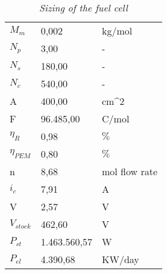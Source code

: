 \begin{table}[ht]
\centering
\begin{tabular}{|lll|}
\hline
\rowcolor{bluepoli!40}\multicolumn{3}{|c|}{\textbf{Fuel cell sizing}}                                  \\ \hline
\multicolumn{1}{|l|}{$M_m$}        & \multicolumn{1}{l|}{0,002}        & kg/mol                \\ \hline
\multicolumn{1}{|l|}{$N_p$}        & \multicolumn{1}{l|}{3,00}         & -                     \\ \hline
\multicolumn{1}{|l|}{$N_s$}        & \multicolumn{1}{l|}{180,00}       & -                     \\ \hline
\multicolumn{1}{|l|}{$N_c$}        & \multicolumn{1}{l|}{540,00}       & -                     \\ \hline
\multicolumn{1}{|l|}{A}            & \multicolumn{1}{l|}{400,00}       & cm\textasciicircum{}2 \\ \hline
\multicolumn{1}{|l|}{F}            & \multicolumn{1}{l|}{96.485,00}    & C/mol                 \\ \hline
\multicolumn{1}{|l|}{$\eta_R$}     & \multicolumn{1}{l|}{0,98}         & $\%$                  \\ \hline
\multicolumn{1}{|l|}{$\eta_{PEM}$} & \multicolumn{1}{l|}{0,80}         & $\%$                  \\ \hline
\multicolumn{1}{|l|}{n}            & \multicolumn{1}{l|}{8,68}         & mol flow rate         \\ \hline
\multicolumn{1}{|l|}{$i_c$}        & \multicolumn{1}{l|}{7,91}         & A                     \\ \hline
\multicolumn{1}{|l|}{V}            & \multicolumn{1}{l|}{2,57}         & V                     \\ \hline
\multicolumn{1}{|l|}{$V_{stock}$}  & \multicolumn{1}{l|}{462,60}       & V                     \\ \hline
\multicolumn{1}{|l|}{$P_{st}$}     & \multicolumn{1}{l|}{1.463.560,57} & W                     \\ \hline
\multicolumn{1}{|l|}{$P_{el}$}     & \multicolumn{1}{l|}{4.390,68}     & KW/day                \\ \hline
\end{tabular}
\caption{\textit{Sizing of the fuel cell}}
\label{tab:sizefuelcells}
\end{table}